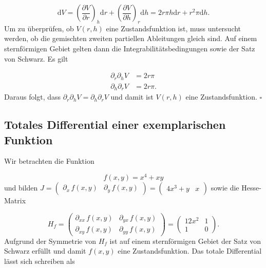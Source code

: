       \begin{equation}
        \text{d}V = \left(\frac{\partial V}{\partial r}\right)_{h} \text{d}r + \left(\frac{\partial V}{\partial h}\right)_{r} \text{d} h = 2r\pi h \text{d}r + r^2 \pi \text{d} h. \label{eq:totalesDifferentialAllgemein} 
      \end{equation}
    Um zu überprüfen, ob $V(r,h)$ eine Zustandsfunktion ist, muss untersucht werden, ob die gemischten zweiten partiellen Ableitungen gleich sind. Auf einem sternförmigen Gebiet gelten dann die Integrabilitätsbedingungen sowie der Satz von Schwarz. Es gilt 
    
      \begin{equation}
        \begin{split}
          \partial_{r}\partial_{h} V &= 2 r\pi  \\
          \partial_{h}\partial_{r} V &= 2 r\pi. \label{eq:ZeiteAbleitungVolumen}
        \end{split}
      \end{equation}
    Daraus folgt, dass $\partial_{r}\partial_{h} V = \partial_{h}\partial_{r} V$ und damit ist $V(r,h)$ eine Zustandsfunktion. $\square$

  \pagebreak
  
  \subsection{Totales Differential einer exemplarischen Funktion}
  
    Wir betrachten die Funktion
    
      \begin{equation}
        f(x,y) = x^4 + xy
      \end{equation}
    und bilden $J = \begin{pmatrix} \partial_{x} \, f(x,y) & \partial_y \, f(x,y)\end{pmatrix} = \begin{pmatrix} 4x^3 + y & x \end{pmatrix}$
    sowie die Hesse-Matrix 
    
      \begin{equation} 
        H_f = \begin{pmatrix} \partial_{xx} \, f(x,y) & \partial_{yx} \, f(x,y)\\ \partial_{xy} \, f(x,y)& \partial_{yy} \, f(x,y) \end{pmatrix} = \begin{pmatrix} 12x^2& 1\\ 1& 0 \end{pmatrix}.
      \end{equation}
    Aufgrund der Symmetrie von $H_f$ ist auf einem sternförmigen Gebiet der Satz von Schwarz erfüllt und damit $f(x,y)$ eine Zustandsfunktion. Das totale Differential lässt sich schreiben als
    
